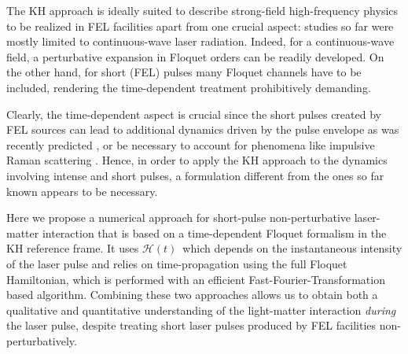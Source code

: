 \documentclass[
pra%
,preprint%
,amssymb, nobibnotes, aps, superscriptaddress, floatfix]{revtex4}
\newcommand{\CAHt}{$\mathcal{H}(t)$}
\begin{document}
The KH approach is ideally suited to describe strong-field high-frequency physics to be realized in FEL facilities apart from one crucial aspect: studies so far were mostly limited to continuous-wave laser radiation. Indeed, for a continuous-wave field, a perturbative expansion in Floquet orders can be readily developed. On the other hand, for short (FEL) pulses many Floquet channels have to be included, rendering the time-dependent treatment prohibitively demanding. 

Clearly, the time-dependent aspect is crucial since the short pulses created by FEL sources can lead to additional dynamics driven by the pulse envelope as was recently predicted \cite{Toyota,Simonsen2016}, or be necessary to account for phenomena like impulsive Raman scattering \cite{Miyabe2015}. Hence, in order to apply the KH approach to the dynamics involving intense and short pulses, a formulation different from the ones so far known appears to be necessary. 

Here we propose a numerical approach for short-pulse non-perturbative laser-matter interaction that is based on a time-dependent Floquet formalism in the KH reference frame. It uses \CAHt\ which depends on the instantaneous intensity of the laser pulse and relies on time-propagation using the full Floquet Hamiltonian, which is performed with an efficient Fast-Fourier-Transformation based algorithm.
Combining these two approaches allows us to obtain both a qualitative and quantitative understanding of the light-matter interaction \emph{during} the laser pulse, despite treating short laser pulses produced by FEL facilities non-perturbatively.
\end{document}
